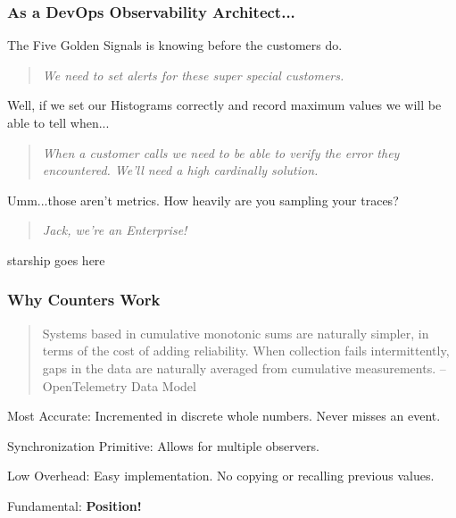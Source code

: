 \begin{frame}
    \frametitle{As a DevOps Observability Architect...}

    The  Five Golden Signals is knowing before the customers do.

    \pause
    \begin{quote}
        \emph{We need to set alerts for these super special customers.}
    \end{quote}

    Well, if we set our Histograms correctly and record maximum values we will
    be able to tell when...

    \pause
    \begin{quote}
        \emph{When a customer calls we need to be able to verify the error
            they encountered.  We'll need a high cardinally solution.}
    \end{quote}

    Umm...those aren't metrics.  How heavily are you sampling your traces?

    \pause
    \begin{quote}
        \emph{Jack, we're an Enterprise!}
    \end{quote}
\end{frame}

\begin{frame}
    starship goes here
\end{frame}



\begin{frame}
    \frametitle{Why Counters Work}

    \begin{quote}
         Systems based in cumulative monotonic sums are naturally simpler, in
         terms of the cost of adding reliability. When collection fails
         intermittently, gaps in the data are naturally averaged from
         cumulative measurements.  -- OpenTelemetry Data Model
    \end{quote}

    Most Accurate: Incremented in discrete whole numbers.  Never misses an
    event.

    Synchronization Primitive: Allows for multiple observers.

    Low Overhead: Easy implementation.  No copying or recalling previous
    values.

    Fundamental: \textbf{Position!}

\end{frame}

